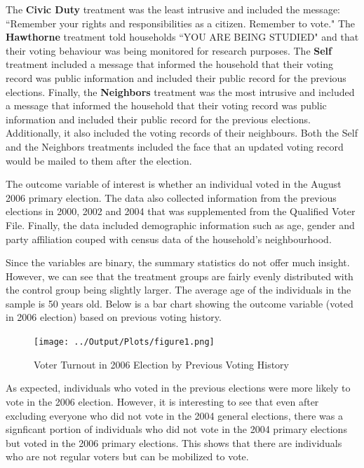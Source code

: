 \documentclass[11pt]{article}
\begin{document}
The \textbf{Civic Duty} treatment was the least intrusive and included the message: ``Remember your rights and responsibilities as a citizen. Remember to vote." The \textbf{Hawthorne} treatment told households ``YOU ARE BEING STUDIED" and that their voting behaviour was being monitored for research purposes. The \textbf{Self} treatment included a message that informed the household that their voting record was public information and included their public record for the previous elections. Finally, the \textbf{Neighbors} treatment was the most intrusive and included a message that informed the household that their voting record was public information and included their public record for the previous elections. Additionally, it also included the voting records of their neighbours.
Both the Self and the Neighbors treatments included the face that an updated voting record would be mailed to them after the election.

The outcome variable of interest is whether an individual voted in the August 2006 primary election. The data also collected information from the previous elections in 2000, 2002 and 2004 that was supplemented from the Qualified Voter File. Finally, the data included demographic information such as age, gender and party affiliation couped with census data of the household's neighbourhood.


Since the variables are binary, the summary statistics do not offer much insight. However, we can see that the treatment groups are fairly evenly distributed with the control group being slightly larger. The average age of the individuals in the sample is 50 years old. Below is a bar chart showing the outcome variable (voted in 2006 election) based on previous voting history.
\begin{figure}[H]
    \centering
    \texttt{[image: ../Output/Plots/figure1.png]}   
    \caption{Voter Turnout in 2006 Election by Previous Voting History}
    \label{fig:figure1}
\end{figure}

As expected, individuals who voted in the previous elections were more likely to vote in the 2006 election. However, it is interesting to see that even after excluding everyone who did not vote in the 2004 general elections, there was a signficant portion of individuals who did not vote in the 2004 primary elections but voted in the 2006 primary elections. This shows that there are individuals who are not regular voters but can be mobilized to vote. 
\end{document}
